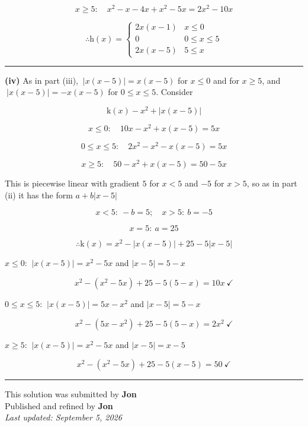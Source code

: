 \documentclass[12pt]{article}
\begin{document}
$$x\geq5:\quad x^2-x-4x+x^2-5x=2x^2-10x$$

$$\therefore \boxed{\mathrm{h}(x)=\begin{cases}2x(x-1)&x\leq0\\ 0&0\leq x\leq5\\ 2x(x-5)&5\leq x\end{cases}}$$

\begin{center}
\end{center}

\bigskip\hrule\bigskip

\textbf{(iv)} As in part (iii), $\ \left|x(x-5)\right|=x(x-5)$ for $x\leq0$ and for $x\geq5$, and $\ \left|x(x-5)\right|=-x(x-5)$ for $0\leq x\leq5$. Consider

$$\mathrm{k}(x)-x^2+\left|x(x-5)\right|$$

$$x\leq0:\quad 10x-x^2+x(x-5)=5x$$

$$0\leq x\leq5:\quad 2x^2-x^2-x(x-5)=5x$$

$$x\geq5:\quad 50-x^2+x(x-5)=50-5x$$

This is piecewise linear with gradient $5$ for $x<5$ and $-5$ for $x>5$, so as in part (ii) it has the form $a+b|x-5|$

$$x<5:\ -b=5;\quad x>5:\ b=-5$$

$$x=5:\ a=25$$

$$\therefore \boxed{\mathrm{k}(x)=x^2-\left|x(x-5)\right|+25-5|x-5|}$$

\bigskip

$x\leq0$: $\ \left|x(x-5)\right|=x^2-5x$ and $|x-5|=5-x$

$$x^2-\left(x^2-5x\right)+25-5(5-x)=10x\ \checkmark$$

$0\leq x\leq5$: $\ \left|x(x-5)\right|=5x-x^2$ and $|x-5|=5-x$

$$x^2-\left(5x-x^2\right)+25-5(5-x)=2x^2\ \checkmark$$

$x\geq5$: $\ \left|x(x-5)\right|=x^2-5x$ and $|x-5|=x-5$

$$x^2-\left(x^2-5x\right)+25-5(x-5)=50\ \checkmark$$

\bigskip
\hrule
\begin{center}
    This solution was submitted by \textbf{Jon}\\[4pt]
    Published and refined by \textbf{Jon}\\[8pt]
    \textit{Last updated: September 5, 2026}
\end{center}
\end{document}

